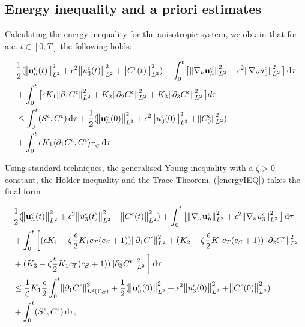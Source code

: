 \documentclass[11pt]{article}
\newcommand*\diff{\mathop{}\!\mathrm{d}}
\begin{document}
  \subsection{Energy inequality and a priori estimates}
  
  Calculating the energy inequality for the anisotropic system, we obtain that for a.e. $t \in [0,T]$ the following holds:
  
  \begin{equation}
    \begin{split}  
    & \frac{1}{2} (\norm{\mathbf{u}_h^\epsilon (t)}_{L^2}^2 + \epsilon ^ 2 \norm{u_3^\epsilon (t)}_{L^2}^2 + \norm{C^\epsilon (t)}_{L^2}^2) + \int_0 ^ t \big[ \norm{\nabla_\nu \mathbf{u}_h^\epsilon}_{L^2}^2 + \epsilon ^ 2 \norm{\nabla_\nu u_3^\epsilon}_{L^2}^2  \big] \diff \tau \\
    & + \int_0 ^ t  \big [ \epsilon K_1 \norm{\partial_1 C^\epsilon}_{L^2}^2  + K_2 \norm{\partial_2 C^\epsilon}_{L^2}^2 + K_3 \norm{\partial_3 C^\epsilon}_{L^2}^2 \big ] d \tau \\
    & \leq \int_0^t (S^\epsilon,C^\epsilon) \diff \tau + \frac{1}{2} (\norm{\mathbf{u}_h^\epsilon (0)}_{L^2}^2 + \epsilon ^ 2 \norm{u_3^\epsilon (0)}_{L^2}^2 + \norm{C^\epsilon_0}_{L^2}^2) \\
    & + \int _ 0 ^ t \epsilon K_1 \langle \partial_1 C^\epsilon, C^\epsilon \rangle_{\Gamma_G} \diff \tau \raisetag{70pt} \label{energyIEQ}
    \end{split}
  \end{equation}
  
  Using standard techniques, the generalised Young inequality with a $\zeta > 0$ constant, the H\"older inequality and the Trace Theorem, (\ref{energyIEQ}) takes the final form

  \begin{equation}
    \begin{split}  
    & \frac{1}{2} (\norm{\mathbf{u}_h^\epsilon (t)}_{L^2}^2 + \epsilon ^ 2 \norm{u_3^\epsilon (t)}_{L^2}^2 + \norm{C^\epsilon (t)}_{L^2}^2) + \int_0 ^ t \big [\norm{\nabla_\nu \mathbf{u}_h^\epsilon}_{L^2}^2 + \epsilon ^ 2 \norm{\nabla_\nu u_3^\epsilon}_{L^2}^2 \big ] \diff \tau \\
    & + \int_0 ^ t \bigg[ (\epsilon K_1 - \zeta \frac{\epsilon}{2} K_1 c_T (c_S + 1)) \norm{\partial_1 C^\epsilon}_{L^2}^2  + (K_2 - \zeta \frac{\epsilon}{2} K_1 c_T (c_S + 1)) \norm{\partial_2 C^\epsilon}_{L^2}^2 \\
    & + (K_3 - \zeta \frac{\epsilon}{2} K_1 c_T (c_S + 1)) \norm{\partial_3 C^\epsilon}_{L^2}^2 \bigg] \diff \tau \\
    & \leq \frac{1}{\zeta} K_1 \frac{\epsilon}{2} \int_0 ^ t \norm{\partial_1 C^\epsilon}^2 _{L^2 (\Gamma_G)} + \frac{1}{2} (\norm{\mathbf{u}_h^\epsilon (0)}_{L^2}^2 + \epsilon ^ 2 \norm{u_3^\epsilon (0)}_{L^2}^2 + \norm{C^\epsilon (0)}_{L^2}^2) \\
    & + \int_0^t (S^\epsilon,C^\epsilon) \diff \tau, \raisetag{20pt} \label{finalformEIEQ}
    \end{split}
  \end{equation}
  
\end{document}
